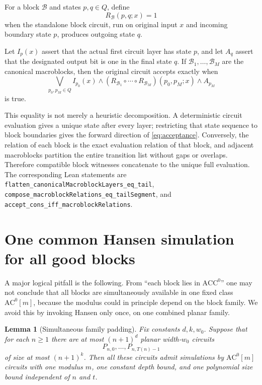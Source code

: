 \documentclass[11pt]{article}
\newtheorem{lemma}[theorem]{Lemma}
\theoremstyle{definition}
\newcommand{\ACC}{\mathrm{ACC}^{0}}
\newcommand{\ACm}[1]{\mathrm{AC}^{0}[#1]}
\newcommand{\cB}{\mathcal{B}}
\begin{document}
For a block $\cB$ and states $p,q\in Q$, define
\[
 R_{\cB}(p,q;x)=1
\]
when the standalone block circuit, run on original input $x$ and incoming
boundary state $p$, produces outgoing state $q$.

Let $I_p(x)$ assert that the actual first circuit layer has state $p$, and let
$A_q$ assert that the designated output bit is one in the final state $q$.
If $\cB_1,\ldots,\cB_M$ are the canonical macroblocks, then the original
circuit accepts exactly when
\begin{equation}\label{eq:acceptance}
  \bigvee_{p_0,p_M\in Q}
  I_{p_0}(x)\wedge
  (R_{\cB_1}\circ\cdots\circ R_{\cB_M})(p_0,p_M;x)
  \wedge A_{p_M}
\end{equation}
is true.

This equality is not merely a heuristic decomposition.  A deterministic
circuit evaluation gives a unique state after every layer; restricting that
state sequence to block boundaries gives the forward direction of
\eqref{eq:acceptance}.  Conversely, the relation of each block is the exact
evaluation relation of that block, and adjacent macroblocks partition the
entire transition list without gaps or overlaps.  Therefore compatible block
witnesses concatenate to the unique full evaluation.  The corresponding Lean
statements are
\nolinkurl{flatten_canonicalMacroblockLayers_eq_tail},
\nolinkurl{compose_macroblockRelations_eq_tailSegment}, and
\nolinkurl{accept_cons_iff_macroblockRelations}.

\section{One common Hansen simulation for all good blocks}\label{sec:hansen}

A major logical pitfall is the following.  From ``each block lies in $\ACC$''
one may not conclude that all blocks are simultaneously available in one
fixed class $\ACm{m}$, because the modulus could in principle depend on the
block family.  We avoid this by invoking Hansen only once, on one combined
planar family.

\begin{lemma}[Simultaneous family padding]\label{lem:padding}
Fix constants $d,k,w_0$.  Suppose that for each $n\ge 1$ there are at most $(n+1)^d$
planar width-$w_0$ circuits
\[
  P_{n,0},\ldots,P_{n,T(n)-1}
\]
of size at most $(n+1)^k$.  Then all these circuits admit simulations by
$\ACm{m}$ circuits with one modulus $m$, one constant depth bound, and one
polynomial size bound independent of $n$ and $t$.
\end{lemma}
\end{document}
